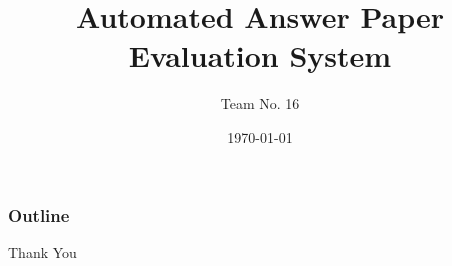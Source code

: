 \documentclass{beamer}
\title[Automated Answer Paper Evaluation]{Automated Answer Paper Evaluation System} %
\author{Team No. 16} %
\institute[Dept. of CSE, GCEK] %
{
\begin{table}
    \centering
    \begin{tabular}{c c}
        \toprule
        \textbf{Name} & \textbf{Roll number}\\
        \midrule
        Pranav T N & 46\\
        Rahul Mohanan A K & 47\\
        Sourabh Subhod & 53\\
        Vishal V & 59\\
        \bottomrule
    \end{tabular}
\end{table}
S7 CSE (2016 Batch)\\
\textit{Guide: Prof. Sajith B}
}
\date{\today} %
\begin{document}
\begin{frame}
\titlepage %
\end{frame}

\begin{frame}
\frametitle{Outline} %
\tableofcontents %
\end{frame}














\begin{frame}
\Huge{\centerline{Thank You}}
\end{frame}
\end{document}
